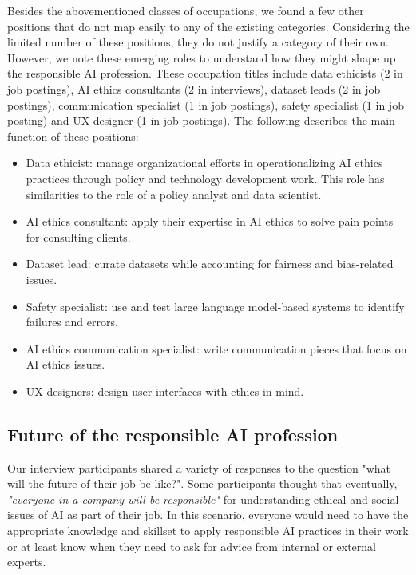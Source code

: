 \documentclass[sigconf]{acmart}
\begin{document}
Besides the abovementioned classes of occupations, we found a few other positions that do not map easily to any of the existing categories. 
Considering the limited number of these positions, they do not justify a category of their own. However, we note these emerging roles to understand how they might shape up the responsible AI profession. These occupation titles include data ethicists (2 in job postings), \ac{AI} ethics consultants (2 in interviews), dataset leads (2 in job postings), communication specialist (1 in job postings), safety specialist (1 in job posting) and UX designer (1 in job postings). The following describes the main function of these positions: 
\begin{itemize}
    \item Data ethicist: manage organizational efforts in operationalizing \ac{AI} ethics practices through policy and technology development work. This role has similarities to the role of a policy analyst and data scientist. 
    \item \ac{AI} ethics consultant: apply their expertise in \ac{AI} ethics to solve pain points for consulting clients.
    \item Dataset lead: curate datasets while accounting for fairness and bias-related issues. 
    \item Safety specialist: use and test large language model-based systems to identify failures and errors. 
    \item \ac{AI} ethics communication specialist: write communication pieces that focus on \ac{AI} ethics issues. 
    \item UX designers: design user interfaces with ethics in mind.
\end{itemize}

\subsection{Future of the responsible AI profession}
Our interview participants shared a variety of responses to the question "what will the future of their job be like?". 
Some participants thought that eventually, \textit{"everyone in a company will be responsible"} for understanding ethical and social issues of \ac{AI} as part of their job. In this scenario, everyone would need to have the appropriate knowledge and skillset to apply responsible \ac{AI} practices in their work or at least know when they need to ask for advice from internal or external experts. 
\end{document}
